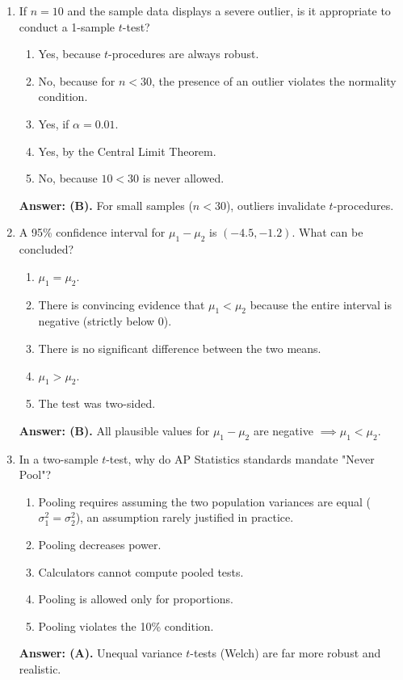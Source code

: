 \begin{enumerate}[leftmargin=1.5em]
  \item If $n = 10$ and the sample data displays a severe outlier, is it appropriate to conduct a 1-sample $t$-test?
  \begin{enumerate}[label=(\Alph*)]
    \item Yes, because $t$-procedures are always robust.
    \item No, because for $n < 30$, the presence of an outlier violates the normality condition.
    \item Yes, if $\alpha = 0.01$.
    \item Yes, by the Central Limit Theorem.
    \item No, because $10 < 30$ is never allowed.
  \end{enumerate}
  \textbf{Answer: (B).} For small samples ($n < 30$), outliers invalidate $t$-procedures.

  \item A 95\% confidence interval for $\mu_1 - \mu_2$ is $(-4.5, -1.2)$. What can be concluded?
  \begin{enumerate}[label=(\Alph*)]
    \item $\mu_1 = \mu_2$.
    \item There is convincing evidence that $\mu_1 < \mu_2$ because the entire interval is negative (strictly below 0).
    \item There is no significant difference between the two means.
    \item $\mu_1 > \mu_2$.
    \item The test was two-sided.
  \end{enumerate}
  \textbf{Answer: (B).} All plausible values for $\mu_1 - \mu_2$ are negative $\implies \mu_1 < \mu_2$.

  \item In a two-sample $t$-test, why do AP Statistics standards mandate "Never Pool"?
  \begin{enumerate}[label=(\Alph*)]
    \item Pooling requires assuming the two population variances are equal ($\sigma_1^2 = \sigma_2^2$), an assumption rarely justified in practice.
    \item Pooling decreases power.
    \item Calculators cannot compute pooled tests.
    \item Pooling is allowed only for proportions.
    \item Pooling violates the 10\% condition.
  \end{enumerate}
  \textbf{Answer: (A).} Unequal variance $t$-tests (Welch) are far more robust and realistic.


\end{enumerate}

